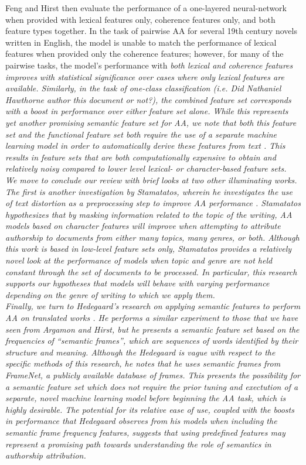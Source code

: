 \documentclass[11pt,a4paper]{article}
\begin{document}
Feng and Hirst then evaluate the performance of a one-layered neural-network when provided with lexical features only, coherence features only, and both feature types together. In the task of pairwise AA for several 19th century novels written in English, the model is unable to match the performance of lexical features when provided only the coherence features; however, for many of the pairwise tasks, the model's performance with \em both \em lexical and coherence features improves with statistical significance over cases where only lexical features are available. Similarly, in the task of one-class classification (i.e. Did Nathaniel Hawthorne author this document or not?), the combined feature set corresponds with a boost in performance over either feature set alone. While this represents yet another promising semantic feature set for AA, we note that both this feature set and the functional feature set both require the use of a separate machine learning model in order to automatically derive these features from text \cite{Argamon2007,Hirst2013}. This results in feature sets that are both computationally expensive to obtain and relatively noisy compared to lower level lexical- or character-based feature sets.\\ 
We move to conclude our review with brief looks at two other illuminating works. The first is another investigation by Stamatatos, wherein he investigates the use of text distortion as a preprocessing step to improve AA performance \cite{Stamatatos2018}. Stamatatos hypothesizes that by masking information related to the topic of the writing, AA models based on character features will improve when attempting to attribute authorship to documents from either many topics, many genres, or both. Although this work is based in low-level feature sets only, Stamatatos provides a relatively novel look at the performance of models when topic and genre are not held constant through the set of documents to be processed. In particular, this research supports our hypotheses that models will behave with varying performance depending on the genre of writing to which we apply them. \\
Finally, we turn to Hedegaard's research on applying semantic features to perform AA on translated works \citeyearpar{Hedegaard2011}. He performs a similar experiment to those that we have seen from Argamon and Hirst, but he presents a semantic feature set based on the frequencies of ``semantic frames'', which are sequences of words identified by their structure and meaning. Although the Hedegaard is vague with respect to the specific methods of this research, he notes that he uses semantic frames from FrameNet, a publicly available database of frames. This presents the possibility for a semantic feature set which does not require the prior tuning and exectution of a separate, novel machine learning model before beginning the AA task, which is highly desirable. The potential for its relative ease of use, coupled with the boosts in performance that Hedegaard observes from his models when including the semantic frame frequency features, suggests that using predefined features may represent a promising path towards understanding the role of semantics in authorship attribution.




\end{document}

